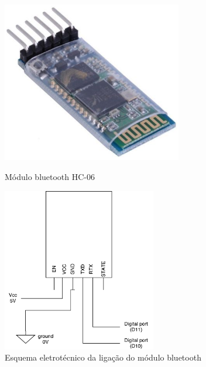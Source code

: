 \begin{figure}[h]
	\centering
	\begin{minipage}[b]{0.4\textwidth}
		\centering
		\includegraphics[width=0.7\textwidth]{img/hardware/bluetooth_zs-040.png}
		\caption{Módulo bluetooth HC-06}
		\label{comimage}
	\end{minipage}
	\hfill
	\begin{minipage}[b]{0.5\textwidth}
		\centering
		\includegraphics[width=0.6\textwidth]{img/comm-blue/electronic-sensors.pdf}
		\caption{Esquema eletrotécnico da ligação do módulo bluetooth}
		\label{comimageesquema}
	\end{minipage}
\end{figure}

\newpage

